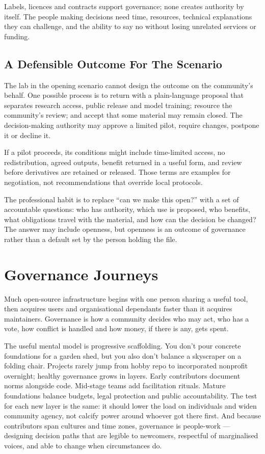 Labels, licences and contracts support governance; none creates authority by itself. The people making decisions need time, resources, technical explanations they can challenge, and the ability to say no without losing unrelated services or funding.



\subsection{A Defensible Outcome For The Scenario}


The lab in the opening scenario cannot design the outcome on the community's behalf. One possible process is to return with a plain-language proposal that separates research access, public release and model training; resource the community's review; and accept that some material may remain closed. The decision-making authority may approve a limited pilot, require changes, postpone it or decline it.


If a pilot proceeds, its conditions might include time-limited access, no redistribution, agreed outputs, benefit returned in a useful form, and review before derivatives are retained or released. Those terms are examples for negotiation, not recommendations that override local protocols.


The professional habit is to replace ``can we make this open?'' with a set of accountable questions: who has authority, which use is proposed, who benefits, what obligations travel with the material, and how can the decision be changed? The answer may include openness, but openness is an outcome of governance rather than a default set by the person holding the file.

\section{Governance Journeys}
Much open-source infrastructure begins with one person sharing a useful tool, then acquires users and organisational dependants faster than it acquires maintainers. Governance is how a community decides who may act, who has a vote, how conflict is handled and how money, if there is any, gets spent.


The useful mental model is progressive scaffolding. You don't pour concrete foundations for a garden shed, but you also don't balance a skyscraper on a folding chair. Projects rarely jump from hobby repo to incorporated nonprofit overnight; healthy governance grows in layers. Early contributors document norms alongside code. Mid-stage teams add facilitation rituals. Mature foundations balance budgets, legal protection and public accountability. The test for each new layer is the same: it should lower the load on individuals and widen community agency, not calcify power around whoever got there first. And because contributors span cultures and time zones, governance is people-work — designing decision paths that are legible to newcomers, respectful of marginalised voices, and able to change when circumstances do.


